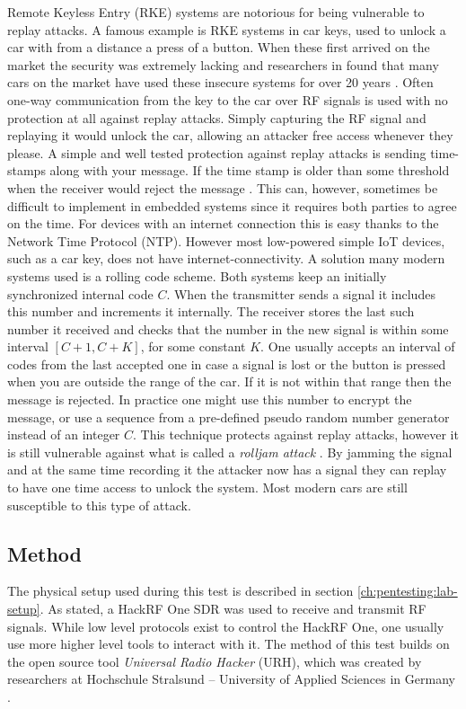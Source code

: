 Remote Keyless Entry (RKE) systems are notorious for being vulnerable to replay attacks. A famous example is RKE systems in car keys, used to unlock a car with from a distance a press of a button. When these first arrived on the market the security was extremely lacking and researchers in \citeyear{car-rke-systems} found that many cars on the market have used these insecure systems for over 20 years \cite{car-rke-systems}. Often one-way communication from the key to the car over RF signals is used with no protection at all against replay attacks. Simply capturing the RF signal and replaying it would unlock the car, allowing an attacker free access whenever they  please. A simple and well tested protection against replay attacks is sending time-stamps along with your message. If the time stamp is older than some threshold when the receiver would reject the message \cite{rke-replay}. This can, however, sometimes be difficult to implement in embedded systems since it requires both parties to agree on the time. For devices with an internet connection this is easy thanks to the Network Time Protocol (NTP). However most low-powered simple IoT devices, such as a car key, does not have internet-connectivity. A solution many modern systems used is a rolling code scheme. Both systems keep an initially synchronized internal code $C$. When the transmitter sends a signal it includes this number and increments it internally. The receiver stores the last such number it received and checks that the number in the new signal is within some interval $[C+1, C+K]$, for some constant $K$. One usually accepts an interval of codes from the last accepted one in case a signal is lost or the button is pressed when you are outside the range of the car. If it is not within that range then the message is rejected. In practice one might use this number to encrypt the message, or use a sequence from a pre-defined pseudo random number generator instead of an integer $C$. This technique protects against replay attacks, however it is still vulnerable against what is called a \textit{rolljam attack} \cite{kamkar2015drive}. By jamming the signal and at the same time recording it the attacker now has a signal they can replay to have one time access to unlock the system. Most modern cars are still susceptible to this type of attack.

\subsection{Method} \label{ch:pentesting:replay:method}
The physical setup used during this test is described in section \ref{ch:pentesting:lab-setup}. As stated, a HackRF One SDR was used to receive and transmit RF signals. While low level protocols exist to control the HackRF One, one usually use more higher level tools to interact with it. The method of this test builds on the open source tool \textit{Universal Radio Hacker} (URH), which was created by researchers at Hochschule Stralsund – University of Applied Sciences in Germany \cite{urh}.

